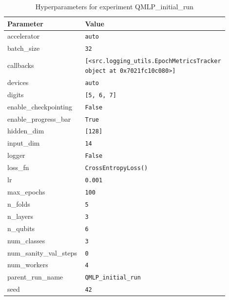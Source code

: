 \documentclass[runningheads]{llncs}
\begin{document}
\begin{table}[t]
\centering
\caption{Hyperparameters for experiment QMLP\_initial\_run}\label{tab1}
\small
\setlength{\tabcolsep}{4pt}
\renewcommand{\arraystretch}{1.1}
\begin{tabular}{>{\RaggedRight\arraybackslash}p{0.35\linewidth}
                >{\RaggedRight\arraybackslash}p{0.55\linewidth}}
\hline
Parameter & Value \\
\hline
accelerator & \texttt{auto} \\
batch\_size & \texttt{32} \\
callbacks & \texttt{[<src.logging\_utils.EpochMetricsTracker object at 0x7021fc10c080>]} \\
devices & \texttt{auto} \\
digits & \texttt{[5, 6, 7]} \\
enable\_checkpointing & \texttt{False} \\
enable\_progress\_bar & \texttt{True} \\
hidden\_dim & \texttt{[128]} \\
input\_dim & \texttt{14} \\
logger & \texttt{False} \\
loss\_fn & \texttt{CrossEntropyLoss()} \\
lr & \texttt{0.001} \\
max\_epochs & \texttt{100} \\
n\_folds & \texttt{5} \\
n\_layers & \texttt{3} \\
n\_qubits & \texttt{6} \\
num\_classes & \texttt{3} \\
num\_sanity\_val\_steps & \texttt{0} \\
num\_workers & \texttt{4} \\
parent\_run\_name & \texttt{QMLP\_initial\_run} \\
seed & \texttt{42} \\
\hline
\end{tabular}
\end{table}
\end{document}
